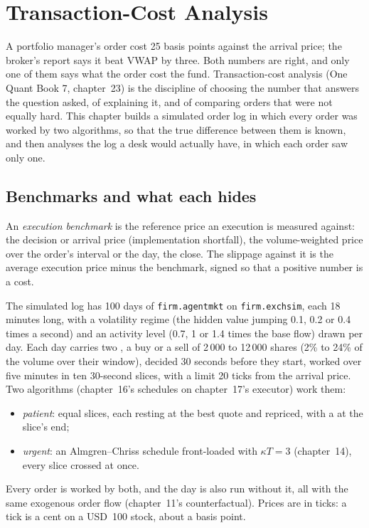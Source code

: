 \chapter{Transaction-Cost Analysis}\label{ch:mx:transaction-cost-analysis}

A portfolio manager's order cost 25 basis points against the arrival price; the broker's report says it beat VWAP by three. Both numbers are right, and
only one of them says what the order cost the fund. Transaction-cost analysis (One Quant Book 7, chapter~23) is the discipline of choosing the number
that answers the question asked, of explaining it, and of comparing orders that were not equally hard. This chapter builds a simulated order log in
which every order was worked by two algorithms, so that the true difference between them is known, and then analyses the log a desk would actually
have, in which each order saw only one.

\section{Benchmarks and what each hides}

\begin{definition}\label{def:mx:transaction-cost-analysis:benchmark}
An \emph{execution benchmark} is the reference price an execution is measured against: the decision or arrival price
(implementation shortfall), the volume-weighted price over the order's interval or the day, the close. The slippage against it is the average
execution price minus the benchmark, signed so that a positive number is a cost.
\end{definition}

The simulated log has 100 days of \texttt{firm.agentmkt} on \texttt{firm.exchsim}, each 18 minutes long, with a volatility regime (the hidden value
jumping 0.1, 0.2 or 0.4 times a second) and an activity level (0.7, 1 or 1.4 times the base flow) drawn per day. Each day carries two ,
a buy or a sell of 2\,000 to 12\,000 shares (2\% to 24\% of the volume over their window), decided 30 seconds before they start, worked over five minutes
in ten 30-second slices, with a limit 20 ticks from the arrival price. Two algorithms (chapter~16's schedules on chapter~17's executor) work them:
\begin{itemize}
\item \emph{patient}: equal slices, each resting at the best quote and repriced, with a  at the slice's end;
\item \emph{urgent}: an Almgren--Chriss schedule front-loaded with $\kappa T=3$ (chapter~14), every slice crossed at once.
\end{itemize}
Every order is worked by both, and the day is also run without it, all with the same exogenous order flow (chapter~11's counterfactual). Prices are
in ticks: a tick is a cent on a USD~100 stock, about a basis point.

